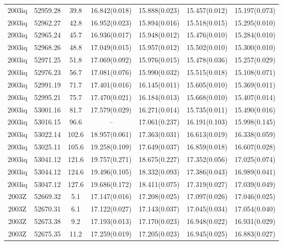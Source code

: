 \begin{table*}
\begin{tabular}{ccccccc}
2003iq	  & 52959.28	 & 39.8	& 16.842(0.018)	 & 15.888(0.023)	 & 15.457(0.012)	 & 15.197(0.073) \\ 
2003iq	  & 52962.27	 & 42.8	& 16.952(0.023)	 & 15.894(0.016)	 & 15.518(0.015)	 & 15.295(0.010) \\ 
2003iq	  & 52965.24	 & 45.7	& 16.936(0.017)	 & 15.948(0.012)	 & 15.476(0.010)	 & 15.284(0.010) \\ 
2003iq	  & 52968.26	 & 48.8	& 17.049(0.015)	 & 15.957(0.012)	 & 15.502(0.010)	 & 15.300(0.010) \\ 
2003iq	  & 52971.25	 & 51.8	& 17.069(0.092)	 & 15.976(0.015)	 & 15.478(0.036)	 & 15.257(0.029) \\ 
2003iq	  & 52976.23	 & 56.7	& 17.081(0.076)	 & 15.990(0.032)	 & 15.515(0.018)	 & 15.108(0.071) \\ 
2003iq	  & 52991.19	 & 71.7	& 17.401(0.016)	 & 16.145(0.011)	 & 15.605(0.010)	 & 15.369(0.011) \\ 
2003iq	  & 52995.21	 & 75.7	& 17.470(0.021)	 & 16.184(0.013)	 & 15.668(0.010)	 & 15.407(0.014) \\ 
2003iq	  & 53001.16	 & 81.7	& 17.579(0.029)	 & 16.271(0.014)	 & 15.735(0.011)	 & 15.490(0.016) \\ 
2003iq	  & 53016.15	 & 96.6	& --	 & 17.061(0.237)	 & 16.191(0.103)	 & 15.998(0.145) \\ 
2003iq	  & 53022.14	 & 102.6	& 18.957(0.061)	 & 17.363(0.031)	 & 16.613(0.019)	 & 16.338(0.059) \\ 
2003iq	  & 53025.11	 & 105.6	& 19.258(0.109)	 & 17.649(0.037)	 & 16.859(0.018)	 & 16.607(0.028) \\ 
2003iq	  & 53041.12	 & 121.6	& 19.757(0.271)	 & 18.675(0.227)	 & 17.352(0.056)	 & 17.025(0.074) \\ 
2003iq	  & 53044.12	 & 124.6	& 19.496(0.105)	 & 18.332(0.093)	 & 17.386(0.043)	 & 16.989(0.041) \\ 
2003iq	  & 53047.12	 & 127.6	& 19.686(0.172)	 & 18.411(0.075)	 & 17.319(0.027)	 & 17.039(0.049) \\ 
2003Z	  & 52669.32	 & 5.1	& 17.147(0.016)	 & 17.208(0.025)	 & 17.097(0.026)	 & 17.046(0.025) \\ 
2003Z	  & 52670.31	 & 6.1	& 17.122(0.027)	 & 17.143(0.037)	 & 17.045(0.034)	 & 17.054(0.040) \\ 
2003Z	  & 52673.38	 & 9.2	& 17.193(0.013)	 & 17.170(0.023)	 & 16.948(0.022)	 & 16.931(0.029) \\ 
2003Z	  & 52675.35	 & 11.2	& 17.259(0.019)	 & 17.205(0.023)	 & 16.945(0.025)	 & 16.883(0.027) \\ 

\end{tabular}
\end{table*}
